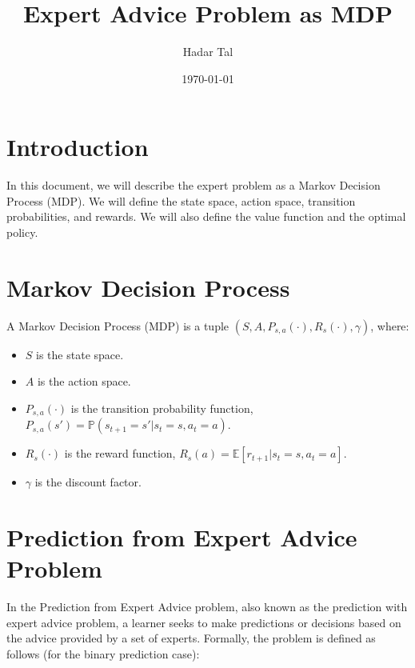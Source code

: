 \documentclass[a4paper, 12pt]{article}
\title{Expert Advice Problem as MDP}
\author{Hadar Tal}
\date{\today}
\begin{document}
\maketitle

\section*{Introduction}

In this document, we will describe the expert problem as a Markov Decision Process (MDP). 
We will define the state space, action space, transition probabilities, and rewards. 
We will also define the value function and the optimal policy.

\section*{Markov Decision Process}

A Markov Decision Process (MDP) is a tuple $(S, A, P_{s,a}(\cdot) , R_s(\cdot), \gamma)$, where:
\begin{itemize}
    \item $S$ is the state space.
    \item $A$ is the action space.
    \item $P_{s,a}(\cdot)$ is the transition probability function, $P_{s,a}(s') = \mathbb{P}(s_{t+1} = s' | s_t = s, a_t = a)$.
    \item $R_s(\cdot)$ is the reward function, $R_s(a) = \mathbb{E}[r_{t+1} | s_t = s, a_t = a]$.
    \item $\gamma$ is the discount factor.
\end{itemize}



\section*{Prediction from Expert Advice Problem}

In the Prediction from Expert Advice problem, also known as the prediction with expert advice problem, 
a learner seeks to make predictions or decisions based on the advice provided by a set of experts. 
Formally, the problem is defined as follows (for the binary prediction case):
\end{document}
